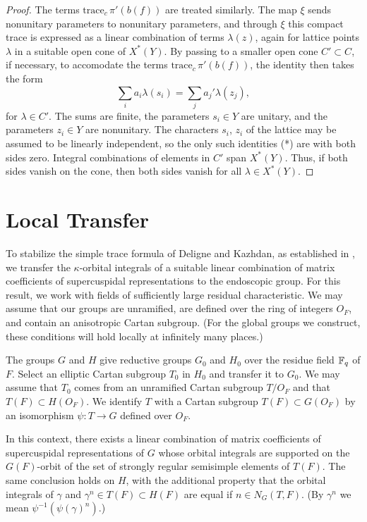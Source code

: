 \documentclass{amsart}
\newenvironment{cthm}[1]
  {\renewcommand\thethm{\sc #1}\thm}
  {\endthm}
\newcommand\Fq{{\Bbb F}_q}
\begin{document}
\begin{proof}
The terms $\text{trace}_c\,\pi'(b(f))$ are treated
similarly.  The map $\xi$ sends nonunitary parameters to nonunitary
parameters, and through $\xi$ this compact trace is expressed as a linear
combination of terms $\lambda(z)$, again for lattice points $\lambda$
in a suitable open cone of $X^*(Y)$.
By passing to a smaller open cone $C'\subset C$, if necessary, to accomodate the
terms $\text{trace}_c\,\pi'(b(f))$, 
the identity then takes the form
    \begin{equation}\tag{*}
    \sum_i a_i \lambda(s_i) = \sum_j a_j'\lambda(z_j),
    \end{equation}
for $\lambda\in C'$.
The sums are finite, the parameters $s_i\in Y$ are unitary, and
the parameters $z_i\in Y$ are nonunitary.
The characters $s_i$, $z_i$ of the lattice 
may be assumed to be linearly independent,
so
 the only such identities (*) are with both sides zero.
Integral combinations
of elements in $C'$ span $X^*(Y)$.
Thus, if both sides vanish on the cone, then both sides vanish
for all $\lambda\in X^*(Y)$.
\end{proof}

\section{Local Transfer }%

To stabilize the simple trace formula of Deligne and Kazhdan,
as established in \cite{He}, we transfer the $\kappa$-orbital integrals
of a suitable linear combination of matrix coefficients of
supercuspidal representations to the endoscopic
group.  For this result, we work with fields of sufficiently
large residual characteristic.  We may assume that our groups
are unramified, are defined over the ring of integers $O_F$,
and contain an anisotropic Cartan subgroup.
(For the global groups we construct, these conditions will hold locally
at infinitely many places.)

The groups $G$ and $H$ give reductive groups $G_0$ and $H_0$
over the residue field $\Fq$ of $F$.  Select an elliptic Cartan
subgroup $T_0$ in $H_0$ and transfer it to $G_0$.  We may assume
that $T_0$ comes from an unramified Cartan subgroup $T/O_F$ and
that $T(F)\subset H(O_F)$. We identify $T$ with a Cartan subgroup
$T(F)\subset G(O_F)$ by an isomorphism $\psi:T\to G$ defined over
$O_F$.

\begin{cthm}{Lemma 5.1}  In this context, there exists a linear
combination of matrix coefficients of supercuspidal representations
of $G$ whose orbital integrals are supported on the $G(F)$-orbit
of the set of strongly regular semisimple elements of $T(F)$.
The same conclusion holds on $H$, with the additional property
that the orbital integrals of $\gamma$ and $\gamma^n\in T(F)\subset H(F)$ 
are equal if $n\in N_G(T,F)$.
(By $\gamma^n$ we mean $\psi^{-1}(\psi(\gamma)^n)$.)
\end{cthm}
\end{document}
